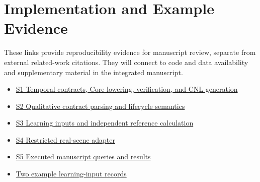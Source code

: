 \documentclass[11pt,a4paper]{article}
\begin{document}
\section*{Implementation and Example Evidence}

These links provide reproducibility evidence for manuscript review, separate from external related-work citations. They will connect to code and data availability and supplementary material in the integrated manuscript.\par

\begin{itemize}
\item \href{\detokenize{../../../../../../projects/04-guardsynth-coc/experiments/paper1_cnl_learning/temporal_preservation.py}}{S1 Temporal contracts, Core lowering, verification, and CNL generation}
\item \href{\detokenize{../../../../../../platforms/eblc-bcv/src/guard_synth_eblc/action_contract.py}}{S2 Qualitative contract parsing and lifecycle semantics}
\item \href{\detokenize{../../../../../../projects/04-guardsynth-coc/experiments/paper1_cnl_learning/temporal_training_data.py}}{S3 Learning inputs and independent reference calculation}
\item \href{\detokenize{../../../../../../projects/04-guardsynth-coc/src/guard_synth/qualitative_scene_contract.py}}{S4 Restricted real-scene adapter}
\item \href{\detokenize{manuscript_examples.json}}{S5 Executed manuscript queries and results}
\item \href{\detokenize{learning_input_examples.json}}{Two example learning-input records}
\end{itemize}
\end{document}
